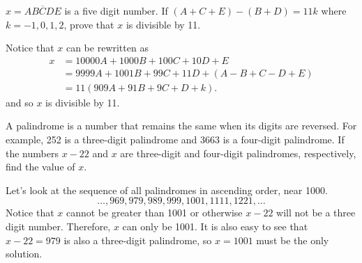 \begin{question}
    $x = \overline{ABCDE}$ is a five digit number. If $(A + C + E) - (B + D) =
    11k$ where $k = -1, 0, 1, 2$, prove that $x$ is divisible by 11.
\end{question}
\begin{solution}
    Notice that $x$ can be rewritten as
    \begin{align*}
        x
        &= 10000A + 1000B + 100C + 10D + E\\
        &= 9999A + 1001B + 99C + 11D + (A - B + C - D + E)\\
        &= 11(909A + 91B + 9C + D + k).
    \end{align*}
    and so $x$ is divisible by 11.
\end{solution}

\begin{question}
    A palindrome is a number that remains the same when its digits are
    reversed. For example, 252 is a three-digit palindrome and 3663 is a
    four-digit palindrome. If the numbers $x - 22$ and $x$ are three-digit and
    four-digit palindromes, respectively, find the value of $x$.
\end{question}
\begin{solution}
    Let's look at the sequence of all palindromes in ascending order, near
    1000.
    \[ \ldots, 969, 979, 989, 999, 1001, 1111, 1221, \ldots \]
    Notice that $x$ cannot be greater than 1001 or otherwise $x - 22$ will not
    be a three digit number. Therefore, $x$ can only be 1001. It is also easy
    to see that $x - 22 = 979$ is also a three-digit palindrome, so $x = 1001$
    must be the only solution.
\end{solution}

